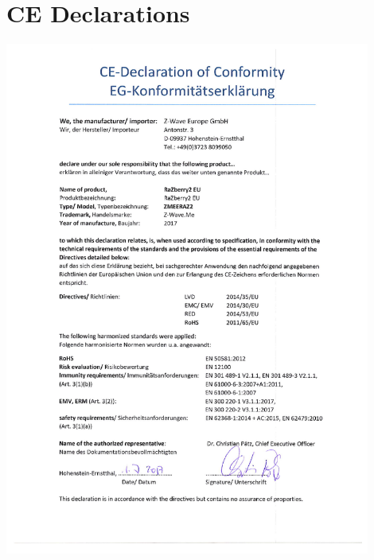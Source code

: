 \chapter{CE Declarations}
\label{annexdeclarations}
 
\includegraphics[width=0.9\textwidth]{pdfs/CE_RAZ2.pdf}

